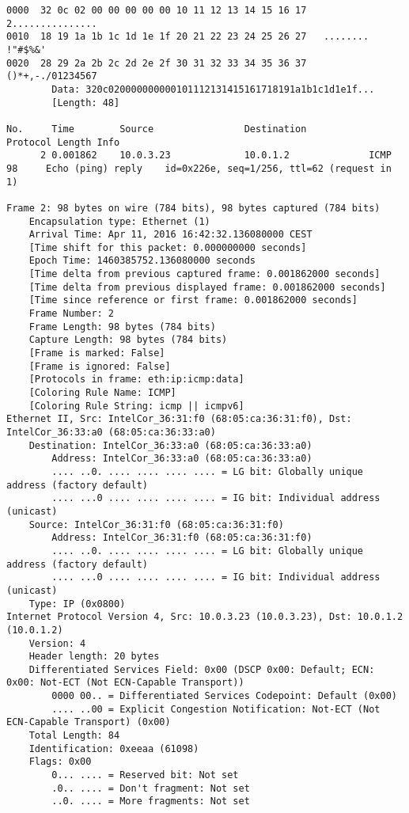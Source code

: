 \begin{lstlisting}
0000  32 0c 02 00 00 00 00 00 10 11 12 13 14 15 16 17   2...............
0010  18 19 1a 1b 1c 1d 1e 1f 20 21 22 23 24 25 26 27   ........ !"#$%&'
0020  28 29 2a 2b 2c 2d 2e 2f 30 31 32 33 34 35 36 37   ()*+,-./01234567
        Data: 320c020000000000101112131415161718191a1b1c1d1e1f...
        [Length: 48]

No.     Time        Source                Destination           Protocol Length Info
      2 0.001862    10.0.3.23             10.0.1.2              ICMP     98     Echo (ping) reply    id=0x226e, seq=1/256, ttl=62 (request in 1)

Frame 2: 98 bytes on wire (784 bits), 98 bytes captured (784 bits)
    Encapsulation type: Ethernet (1)
    Arrival Time: Apr 11, 2016 16:42:32.136080000 CEST
    [Time shift for this packet: 0.000000000 seconds]
    Epoch Time: 1460385752.136080000 seconds
    [Time delta from previous captured frame: 0.001862000 seconds]
    [Time delta from previous displayed frame: 0.001862000 seconds]
    [Time since reference or first frame: 0.001862000 seconds]
    Frame Number: 2
    Frame Length: 98 bytes (784 bits)
    Capture Length: 98 bytes (784 bits)
    [Frame is marked: False]
    [Frame is ignored: False]
    [Protocols in frame: eth:ip:icmp:data]
    [Coloring Rule Name: ICMP]
    [Coloring Rule String: icmp || icmpv6]
Ethernet II, Src: IntelCor_36:31:f0 (68:05:ca:36:31:f0), Dst: IntelCor_36:33:a0 (68:05:ca:36:33:a0)
    Destination: IntelCor_36:33:a0 (68:05:ca:36:33:a0)
        Address: IntelCor_36:33:a0 (68:05:ca:36:33:a0)
        .... ..0. .... .... .... .... = LG bit: Globally unique address (factory default)
        .... ...0 .... .... .... .... = IG bit: Individual address (unicast)
    Source: IntelCor_36:31:f0 (68:05:ca:36:31:f0)
        Address: IntelCor_36:31:f0 (68:05:ca:36:31:f0)
        .... ..0. .... .... .... .... = LG bit: Globally unique address (factory default)
        .... ...0 .... .... .... .... = IG bit: Individual address (unicast)
    Type: IP (0x0800)
Internet Protocol Version 4, Src: 10.0.3.23 (10.0.3.23), Dst: 10.0.1.2 (10.0.1.2)
    Version: 4
    Header length: 20 bytes
    Differentiated Services Field: 0x00 (DSCP 0x00: Default; ECN: 0x00: Not-ECT (Not ECN-Capable Transport))
        0000 00.. = Differentiated Services Codepoint: Default (0x00)
        .... ..00 = Explicit Congestion Notification: Not-ECT (Not ECN-Capable Transport) (0x00)
    Total Length: 84
    Identification: 0xeeaa (61098)
    Flags: 0x00
        0... .... = Reserved bit: Not set
        .0.. .... = Don't fragment: Not set
        ..0. .... = More fragments: Not set

\end{lstlisting}
